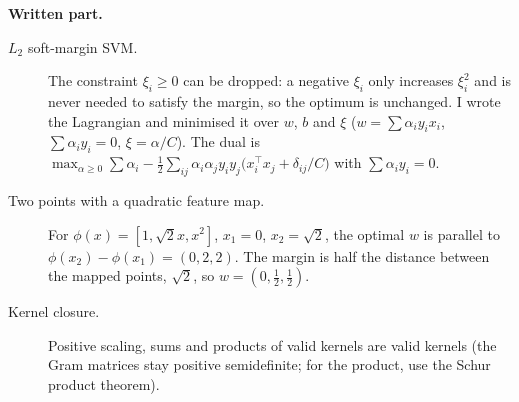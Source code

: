 \textbf{Written part.}
\begin{description}
  \item[$L_2$ soft-margin SVM.] The constraint $\xi_i\ge0$ can be dropped: a negative $\xi_i$ only increases $\xi_i^2$ and is never needed to satisfy the margin, so the optimum is unchanged. I wrote the Lagrangian and minimised it over $w$, $b$ and $\xi$ ($w=\sum\alpha_iy_ix_i$, $\sum\alpha_iy_i=0$, $\xi=\alpha/C$). The dual is $\max_{\alpha\ge0}\sum\alpha_i-\tfrac12\sum_{ij}\alpha_i\alpha_jy_iy_j\big(x_i^\top x_j+\delta_{ij}/C\big)$ with $\sum\alpha_iy_i=0$.
  \item[Two points with a quadratic feature map.] For $\phi(x)=[1,\sqrt2x,x^2]$, $x_1=0$, $x_2=\sqrt2$, the optimal $w$ is parallel to $\phi(x_2)-\phi(x_1)=(0,2,2)$. The margin is half the distance between the mapped points, $\sqrt2$, so $w=(0,\tfrac12,\tfrac12)$.
  \item[Kernel closure.] Positive scaling, sums and products of valid kernels are valid kernels (the Gram matrices stay positive semidefinite; for the product, use the Schur product theorem).
\end{description}

